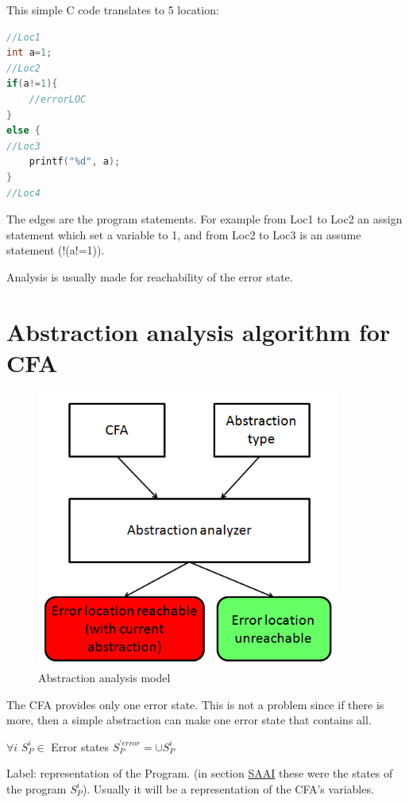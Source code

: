 \label{fig:simpleC}This simple C code translates to 5 location:
\begin{lstlisting}[language=C,breaklines=true]
//Loc1
int a=1;
//Loc2
if(a!=1){
	//errorLOC
}
else {
//Loc3
	printf("%d", a);
}
//Loc4
\end{lstlisting}

The edges are the program statements. For example from Loc1 to Loc2 an assign statement which set a variable to 1, and from Loc2 to Loc3 is an assume statement (!(a!=1)).

Analysis is usually made for reachability of the error state.

\section{Abstraction analysis algorithm for CFA}
\label{sec:cfaalgorithm}

\begin{figure} [!ht]
	\centering
	\includegraphics[width=100mm, keepaspectratio]{figures/abstractanalyzer.png}
	\caption{\label{fig:absanalyzer} Abstraction analysis model}
\end{figure}

The CFA provides only one error state. This is not a problem since if there is more, then a simple abstraction can make one error state that contains all.

$\forall i$ $S_{P}^{i} \in $ Error states $S_{P}^{'error}=\cup S_{P}^{i}$

Label: representation of the Program. (in section \hyperref[sec:saai]{SAAI} these were the states of the program  $S_{P}^{i}$). Usually it will be a representation of the CFA's variables.

